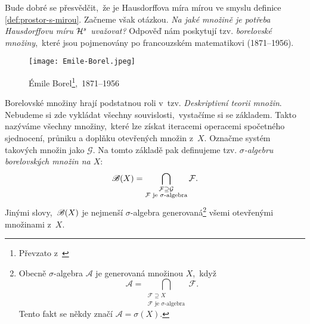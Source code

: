 Bude dobré se přesvědčit,~že je Hausdorffova míra mírou ve smyslu definice \ref{def:prostor-s-mirou}. Začneme však otázkou. \emph{Na jaké množině je potřeba Hausdorffovu míru $\mathcal{H}^{s}$ uvažovat?} Odpověď nám poskytují tzv. \emph{borelovské množiny},~které jsou pojmenovány po francouzském matematikovi  (1871--1956).
\begin{figure}[h]
    \centering
    \texttt{[image: Emile-Borel.jpeg]}
    \caption[Émile Borel,~1871--1956]{Émile Borel\footnote{Převzato z~\cite{OConnorBorel2025}},~1871--1956}
    \label{fig:emile-borel}
\end{figure}
Borelovské množiny hrají podstatnou roli v~tzv. \emph{Deskriptivní teorii množin}. Nebudeme si zde vykládat všechny souvislosti,~vystačíme si se základem. Takto nazýváme všechny množiny,~které lze získat iteracemi operacemi spočetného sjednocení, průniku a doplňku otevřených množin z~$X$. Označme systém takových množin jako $\mathcal{G}$. Na tomto základě pak definujeme tzv. \emph{$\sigma$-algebru borelovských množin na $X$}:
\[\mathscr{B}(X)=\bigcap_{\substack{\mathcal{F}\supseteq\mathcal{G}\\\text{$\mathcal{F}$ je $\sigma$-algebra}}}\mathcal{F}.\]
Jinými slovy,~$\mathscr{B}(X)$ je nejmenší $\sigma$-algebra generovaná\footnote{Obecně $\sigma$-algebra $\mathcal{A}$ je generovaná množinou $X$,~když
\[\mathcal{A}=\bigcap_{\substack{\mathcal{F}\supseteq X\\\text{$\mathcal{F}$ je $\sigma$-algebra}}}\mathcal{F}.\]
Tento fakt se někdy značí $\mathcal{A}=\sigma(X)$.} všemi otevřenými množinami z~$X$.

